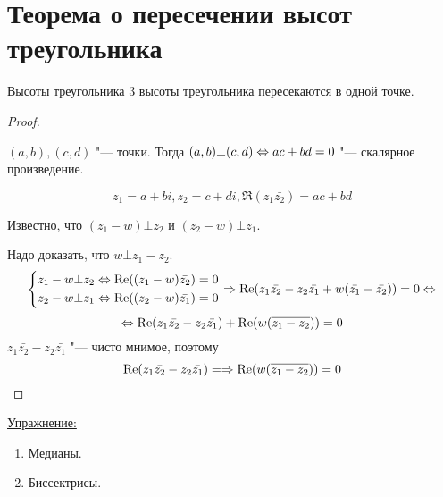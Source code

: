 \section{Теорема о пересечении высот треугольника}
\begin{theorem}{Высоты треугольника} 3 высоты треугольника пересекаются в одной точке.
\end{theorem}
\begin{proof}
\begin{center}
\def\svgwidth{6.0cm}

\end{center}

$(a, b), (c, d)$ "--- точки. Тогда $(a, b) \bot (c, d) \Leftrightarrow ac + bd = 0$ "--- скалярное произведение.

$$z_1 = a + bi, z_2 = c + di, \Re (z_1\bar{z_2}) = ac + bd$$

Известно, что $(z_1 - w) \bot z_2$ и $(z_2 - w) \bot z_1$.

Надо доказать, что $w \bot z_1 - z_2$.
$$\left\{
\begin{aligned}
	z_1 - w \bot z_2 &\Leftrightarrow \mathop{\mathrm{Re}}\nolimits((z_1 - w)\bar{z_2}) = 0 \\
	z_2 - w \bot z_1 &\Leftrightarrow \mathop{\mathrm{Re}}\nolimits((z_2 - w)\bar{z_1}) = 0
\end{aligned}\right.
\Rightarrow \mathop{\mathrm{Re}}\nolimits(z_1\bar{z_2} - z_2\bar{z_1} + w(\bar{z_1} - \bar{z_2})) = 0 \Leftrightarrow
$$
$$\Leftrightarrow \mathop{\mathrm{Re}}\nolimits(z_1\bar{z_2} - z_2\bar{z_1}) + \mathop{\mathrm{Re}}\nolimits(w(\overline{z_1 - z_2})) = 0$$
$z_1\bar{z_2} - z_2\bar{z_1}$ "--- чисто мнимое, поэтому 
$$\mathop{\mathrm{Re}}\nolimits(z_1\bar{z_2} - z_2\bar{z_1}) = \Rightarrow \mathop{\mathrm{Re}}\nolimits(w(\overline{z_1 - z_2})) = 0$$
\end{proof}

\underline{Упражнение:}
\begin{enumerate}
\item Медианы.
\item Биссектрисы.
\end{enumerate}